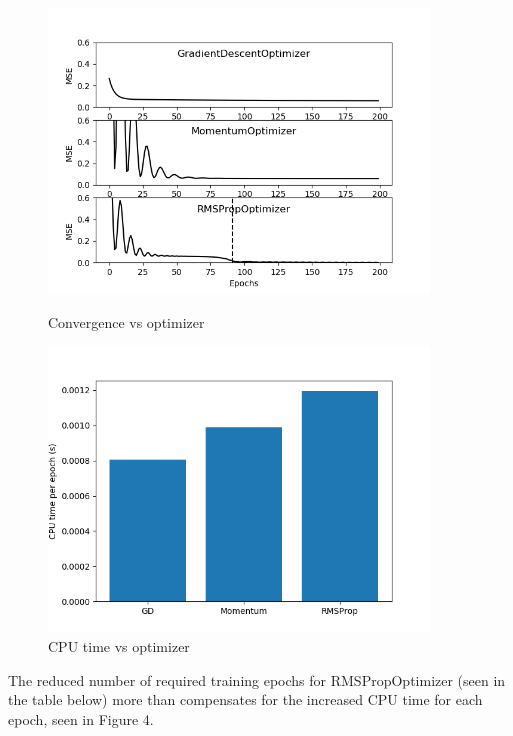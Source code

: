 \documentclass[11pt]{article}
\begin{document}
\begin{enumerate}
\begin{figure}[h!]
    \centering
    \begin{minipage}{0.45\textwidth}
        \centering
        \includegraphics[width=0.9\textwidth]{q1b-2b} %
        \caption{Convergence vs optimizer}
    \end{minipage}\hfill
    \begin{minipage}{0.45\textwidth}
        \centering
        \includegraphics[width=0.9\textwidth]{q1b-3_cpu-time} %
        \caption{CPU time vs optimizer}
    \end{minipage}
\end{figure}

The reduced number of required training epochs for RMSPropOptimizer (seen in the table below) more than compensates for the increased CPU time for each epoch, seen in Figure 4.\newline




\end{enumerate}
\end{document}
